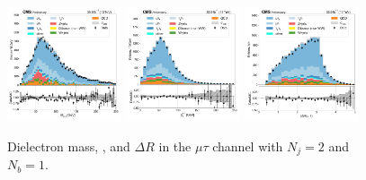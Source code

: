 \begin{figure}[htb!]
    \centering
    \includegraphics[width=0.3\textwidth]{chapters/Appendix/sectionPlots/figures/data_mc_overlays/mutau_2016_cat_eq2_eq1_signal_linear_lepton_dilepton1_mass}
    \includegraphics[width=0.3\textwidth]{chapters/Appendix/sectionPlots/figures/data_mc_overlays/mutau_2016_cat_eq2_eq1_signal_linear_lepton_dilepton1_pt}
    \includegraphics[width=0.3\textwidth]{chapters/Appendix/sectionPlots/figures/data_mc_overlays/mutau_2016_cat_eq2_eq1_signal_linear_lepton_dilepton1_delta_r}
    \caption{Dielectron mass, \pt, and $\Delta R$ in the $\mu\tau$ channel
    with $N_{j} = 2$ and $N_{b} = 1$.}
    \label{fig:mutau_5_dilepton}
\end{figure}

